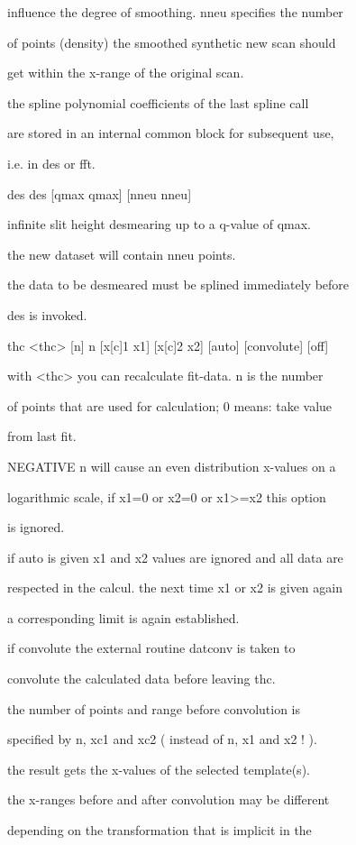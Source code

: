 \documentclass[]{article}
\begin{document}
influence the degree of smoothing. nneu specifies the number

of points (density) the smoothed synthetic new scan should

get within the x-range of the original scan.

the spline polynomial coefficients of the last spline call

are stored in an internal common block for subsequent use,

i.e. in des or fft.

des des {[}qmax qmax{]} {[}nneu nneu{]}

infinite slit height desmearing up to a q-value of qmax.

the new dataset will contain nneu points.

the data to be desmeared must be splined immediately before

des is invoked.

thc \textless{}thc\textgreater{} {[}n{]} n {[}x{[}c{]}1 x1{]}
{[}x{[}c{]}2 x2{]} {[}auto{]} {[}convolute{]} {[}off{]}

with \textless{}thc\textgreater{} you can recalculate fit-data. n is the
number

of points that are used for calculation; 0 means: take value

from last fit.

NEGATIVE n will cause an even distribution x-values on a

logarithmic scale, if x1=0 or x2=0 or x1\textgreater{}=x2 this option

is ignored.

if auto is given x1 and x2 values are ignored and all data are

respected in the calcul. the next time x1 or x2 is given again

a corresponding limit is again established.

if convolute the external routine datconv is taken to

convolute the calculated data before leaving thc.

the number of points and range before convolution is

specified by n, xc1 and xc2 ( instead of n, x1 and x2 ! ).

the result gets the x-values of the selected template(s).

the x-ranges before and after convolution may be different

depending on the transformation that is implicit in the
\end{document}
